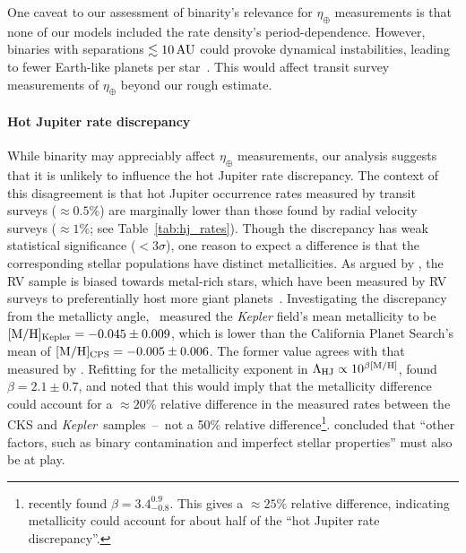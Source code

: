 \documentclass[12pt,modern]{aastex61}
\begin{document}
One caveat to our assessment of binarity's relevance for 
$\eta_\oplus$ measurements is that none of our models 
included the rate density's period-dependence. However, binaries with 
separations $\lesssim 10\,{\rm AU}$ could
provoke dynamical instabilities, leading to fewer Earth-like planets per 
star~\citep[\textit{e.g.},][]{holman_long-term_1999,wang_influence_2014,
    kraus_impact_2016}.
This would affect transit survey measurements of $\eta_\oplus$ beyond our 
rough estimate.

\paragraph{Hot Jupiter rate discrepancy}
While binarity may appreciably affect $\eta_\oplus$ measurements, our analysis
suggests that it is unlikely to influence the hot Jupiter rate discrepancy.
The context of this disagreement is that hot Jupiter occurrence rates measured 
by transit surveys ($\approx 0.5\%$) are marginally lower than those found by 
radial velocity surveys ($\approx 1\%$; see Table~\ref{tab:hj_rates}).
Though the discrepancy has weak statistical significance ($<3\sigma$),
one reason to expect a difference is that the corresponding stellar 
populations have distinct metallicities.
As argued by \citet{gould_frequency_2006}, the RV sample is biased towards 
metal-rich stars, which have been measured by RV surveys to preferentially 
host more giant 
planets~\citep{santos_spectroscopic_2004,fischer_planet-metallicity_2005}.
Investigating the discrepancy from the metallicty 
angle,~\citet{guo_metallicity_2017} measured the
{\it Kepler} field's mean metallicity to be $[{\rm M/H}]_{\rm Kepler}= 
-0.045\pm0.009$, which is lower than the California Planet Search's mean of 
$[{\rm M/H}]_{\rm CPS}= -0.005\pm0.006$.
The former value agrees with that measured by \citet{dong_metallicities_2014}.
Refitting for the metallicity exponent in $\Lambda_{\rm HJ} \propto 10^{\beta 
    [{\rm M/H}] }$, \citeauthor{guo_metallicity_2017}\! found $\beta = 2.1\pm 
0.7$, and noted that this would imply that the metallicity difference could 
account for a $\approx 20\%$ relative difference in the measured rates between 
the CKS and {\it Kepler}\ samples~--~not a 50\% relative difference\footnote{
    \citet{petigura_CKS_2017} recently found $\beta = 3.4^{0.9}_{-0.8}$.
    This gives a $\approx 25\%$ relative difference, indicating metallicity 
    could 
    account for about half of the ``hot Jupiter rate discrepancy''.
}.
\citeauthor{guo_metallicity_2017}\! concluded that ``other factors, such as 
binary contamination and imperfect stellar properties'' must also be at play.
\end{document}
